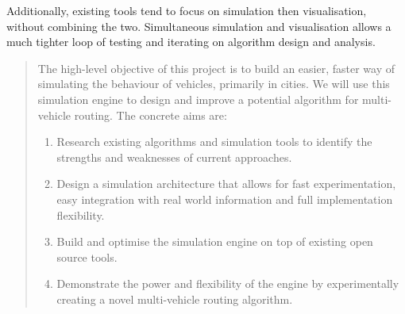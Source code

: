 \documentclass[ %
                    author={Alexander Hill},
                supervisor={Dr. Benjamin Sach},
                    degree={MEng},
                     title={MARMOSET},
                  subtitle={Multi-Agent Route Management using Online Simulation for Efficient Transportation},
                      type={research},
                      year={2016} ]{dissertation}
\begin{document}
Additionally, existing tools tend to focus on simulation then visualisation,
without combining the two. Simultaneous simulation and visualisation allows a
much tighter loop of testing and iterating on algorithm design and analysis.

\begin{quote}
\noindent
The high-level objective of this project is to build an easier, faster way of
simulating the behaviour of vehicles, primarily in cities. We will use this
simulation engine to design and improve a potential algorithm for multi-vehicle
routing. The concrete aims are:

\begin{enumerate}
    \item Research existing algorithms and simulation tools to identify the
            strengths and weaknesses of current approaches.
    \item Design a simulation architecture that allows for fast experimentation,
        easy integration with real world information and full implementation
        flexibility.
    \item Build and optimise the simulation engine on top of existing open
        source tools.
    \item Demonstrate the power and flexibility of the engine by experimentally
        creating a novel multi-vehicle routing algorithm.
\end{enumerate}

\end{quote}


\end{document}
